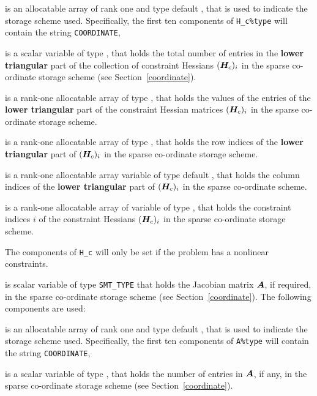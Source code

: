 \documentclass{galahad}
\begin{document}
\begin{description}
\begin{description}

 is an allocatable array of rank one and type default
\character, that is used to indicate the storage scheme used. Specifically,
the first ten components of {\tt H\_c\%type} will contain the
string {\tt COORDINATE},

 is a scalar variable of type \integer, that
holds the total number of entries in the {\bf lower triangular} part of 
the collection of constraint Hessians $({\bm{H}}_c)_i$
in the sparse co-ordinate storage scheme (see Section~\ref{coordinate}).

 is a rank-one allocatable array of type \realdp, that
holds the values of the entries of the {\bf lower triangular} part
of the constraint Hessian matrices $({\bm{H}}_c)_i$ 
in the sparse co-ordinate storage scheme.

 is a rank-one allocatable array of type \integer,
that holds the row indices of the {\bf lower triangular} part of 
$({\bm{H}}_c)_i$ in the sparse co-ordinate storage scheme.

 is a rank-one allocatable array variable of type default
\integer, that holds the column indices of the {\bf lower triangular} part of
$({\bm{H}}_c)_i$ in the sparse co-ordinate scheme.

 is a rank-one allocatable array of variable of type
\integer, that holds the constraint indices $i$
of the constraint Hessians $({\bm{H}}_c)_i$
in the sparse co-ordinate storage scheme.
\end{description}

The components of {\tt H\_c} will only be set if the problem has a
nonlinear constraints.

 is scalar variable of type {\tt SMT\_TYPE}
that holds the Jacobian matrix ${\bm{A}}$, if required,
in the sparse co-ordinate storage scheme (see Section~\ref{coordinate}).
The following components are used:

\begin{description}

 is an allocatable array of rank one and type default \character,
that is used to indicate the storage scheme used. Specifically,
the first ten components of {\tt A\%type} will contain the
string {\tt COORDINATE},

 is a scalar variable of type \integer, that
holds the number of entries in ${\bm{A}}$, if any,
in the sparse co-ordinate storage scheme (see Section~\ref{coordinate}).


\end{description}
\end{description}
\end{document}
